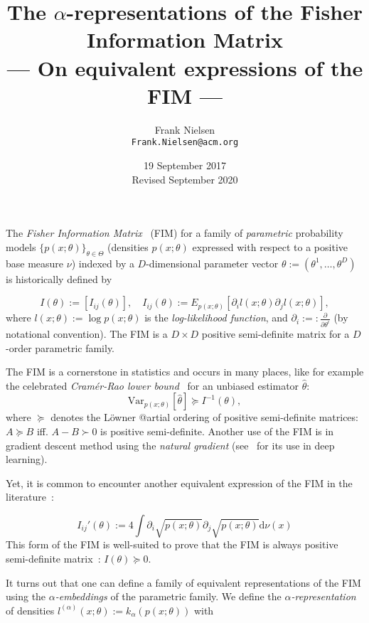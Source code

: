 \documentclass[11pt]{article}
\title{The $\alpha$-representations of the Fisher Information Matrix\\ --- On equivalent expressions of the FIM ---}
\date{19 September 2017\\ Revised September 2020}
\author{Frank Nielsen\\ {\tt Frank.Nielsen@acm.org}}
\def\eqdef{:=}
\def\eqnota{:=:}
\def\dnu{\mathrm{d}\nu}
\def\Var{\mathrm{Var}}
\begin{document}
\maketitle



The {\em Fisher Information Matrix}~\cite{IG-2014} (FIM) for a family of {\em parametric} probability models $\{p(x;\theta)\}_{\theta\in\Theta}$ 
(densities $p(x;\theta)$ expressed with respect to a positive base measure $\nu$) indexed by
 a $D$-dimensional parameter vector $\theta\eqdef(\theta^1,\ldots,\theta^D)$  is historically defined by

\begin{equation}\label{eq:FIM1}
I(\theta) \eqdef [I_{ij}(\theta)],
\quad I_{ij}(\theta) \eqdef E_{p(x;\theta)}\left[\partial_i l(x;\theta)\partial_j l(x;\theta)\right],
\end{equation}
where $l(x;\theta)\eqdef\log p(x;\theta)$ is the {\em log-likelihood function}, and 
$\partial_i \eqnota \frac{\partial}{\partial\theta^i}$ (by notational convention).
The FIM is a $D\times D$ positive semi-definite matrix for a $D$-order parametric family.

The FIM  is a cornerstone in statistics and occurs in many places, like for example the celebrated
 {\em Cram\'er-Rao lower bound}~\cite{CR-2013} for an unbiased estimator $\hat\theta$:
$$
\Var_{p(x;\theta)}[\hat{\theta}]\succeq I^{-1}(\theta),
$$
where $\succeq$ denotes the L\"owner @artial ordering of positive semi-definite matrices: 
$A\succeq B$  iff. $A-B\succ 0$ is  positive semi-definite.
Another use of the FIM is in gradient descent method using the {\em natural gradient} (see~\cite{RFIM-2017}  for its use in deep learning).

Yet, it is common to encounter another equivalent expression of the FIM in the literature~\cite{CR-2013,IG-2014}:

\begin{equation}\label{eq:FIM0}
I_{ij}'(\theta) \eqdef 4\int \partial_i\sqrt{p(x;\theta)}\partial_j\sqrt{p(x;\theta)}\dnu(x)
\end{equation}
This form of the FIM is well-suited to prove that the FIM is always positive semi-definite matrix~\cite{IG-2014}: $I(\theta)\succeq 0$.



It turns out that one can define a family of equivalent representations of the FIM using the {\em $\alpha$-embeddings} of the parametric family.
We define the {\em $\alpha$-representation} of densities $l^{(\alpha)}(x;\theta):=k_\alpha(p(x;\theta))$ with
\end{document}

